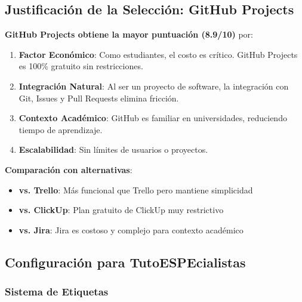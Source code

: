 \documentclass[12pt,a4paper]{article}
\begin{document}
\subsection{Justificación de la Selección: GitHub Projects}

\textbf{GitHub Projects obtiene la mayor puntuación (8.9/10)} por:

\begin{enumerate}
    \item \textbf{Factor Económico}: Como estudiantes, el costo es crítico. GitHub Projects es 100\% gratuito sin restricciones.
    \item \textbf{Integración Natural}: Al ser un proyecto de software, la integración con Git, Issues y Pull Requests elimina fricción.
    \item \textbf{Contexto Académico}: GitHub es familiar en universidades, reduciendo tiempo de aprendizaje.
    \item \textbf{Escalabilidad}: Sin límites de usuarios o proyectos.
\end{enumerate}

\textbf{Comparación con alternativas}:
\begin{itemize}
    \item \textbf{vs. Trello}: Más funcional que Trello pero mantiene simplicidad
    \item \textbf{vs. ClickUp}: Plan gratuito de ClickUp muy restrictivo
    \item \textbf{vs. Jira}: Jira es costoso y complejo para contexto académico
\end{itemize}

\subsection{Configuración para TutoESPEcialistas}

\subsubsection{Sistema de Etiquetas}
\end{document}
